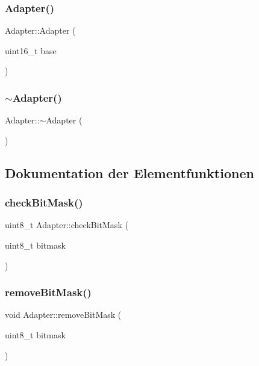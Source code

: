 \subsubsection{\texorpdfstring{Adapter()}{Adapter()}}
{\footnotesize\ttfamily Adapter\+::\+Adapter (\begin{DoxyParamCaption}\item[{uint16\+\_\+t}]{base }\end{DoxyParamCaption})}

\hypertarget{class_adapter_a08a07acff57eb40aba27455de23ed13c}{}\label{class_adapter_a08a07acff57eb40aba27455de23ed13c} 
\subsubsection{\texorpdfstring{$\sim$\+Adapter()}{~Adapter()}}
{\footnotesize\ttfamily Adapter\+::$\sim$\+Adapter (\begin{DoxyParamCaption}{ }\end{DoxyParamCaption})}



\subsection{Dokumentation der Elementfunktionen}
\hypertarget{class_adapter_a8b1478082798b063a0c04d98fdea06a2}{}\label{class_adapter_a8b1478082798b063a0c04d98fdea06a2} 
\subsubsection{\texorpdfstring{check\+Bit\+Mask()}{checkBitMask()}}
{\footnotesize\ttfamily uint8\+\_\+t Adapter\+::check\+Bit\+Mask (\begin{DoxyParamCaption}\item[{uint8\+\_\+t}]{bitmask }\end{DoxyParamCaption})}

\hypertarget{class_adapter_a655de45764223d7b1b3847170cc405a5}{}\label{class_adapter_a655de45764223d7b1b3847170cc405a5} 
\subsubsection{\texorpdfstring{remove\+Bit\+Mask()}{removeBitMask()}}
{\footnotesize\ttfamily void Adapter\+::remove\+Bit\+Mask (\begin{DoxyParamCaption}\item[{uint8\+\_\+t}]{bitmask }\end{DoxyParamCaption})}

